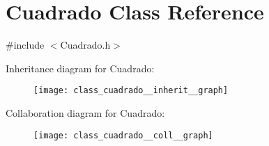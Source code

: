 \hypertarget{class_cuadrado}{\section{Cuadrado Class Reference}
\label{class_cuadrado}
}


{\ttfamily \#include $<$Cuadrado.\+h$>$}



Inheritance diagram for Cuadrado\+:
\nopagebreak
\begin{figure}[H]
\begin{center}
\leavevmode
\texttt{[image: class\_cuadrado\_\_inherit\_\_graph]}
\end{center}
\end{figure}


Collaboration diagram for Cuadrado\+:
\nopagebreak
\begin{figure}[H]
\begin{center}
\leavevmode
\texttt{[image: class\_cuadrado\_\_coll\_\_graph]}
\end{center}
\end{figure}
